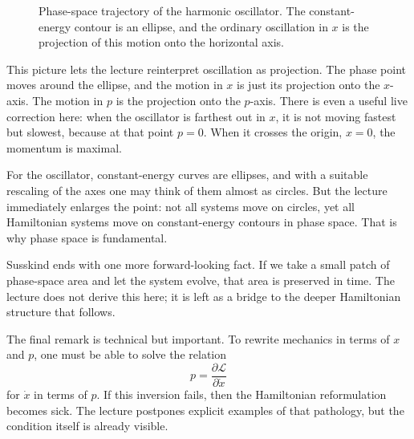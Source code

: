 \begin{figure}[h]
\centering
{}
\caption{Phase-space trajectory of the harmonic oscillator. The constant-energy contour is an ellipse, and the ordinary oscillation in \(x\) is the projection of this motion onto the horizontal axis.}
\end{figure}

This picture lets the lecture reinterpret oscillation as projection. The phase point moves around the ellipse, and the motion in \(x\) is just its projection onto the \(x\)-axis. The motion in \(p\) is the projection onto the \(p\)-axis. There is even a useful live correction here: when the oscillator is farthest out in \(x\), it is not moving fastest but slowest, because at that point \(p=0\). When it crosses the origin, \(x=0\), the momentum is maximal.

For the oscillator, constant-energy curves are ellipses, and with a suitable rescaling of the axes one may think of them almost as circles. But the lecture immediately enlarges the point: not all systems move on circles, yet all Hamiltonian systems move on constant-energy contours in phase space. That is why phase space is fundamental.

Susskind ends with one more forward-looking fact. If we take a small patch of phase-space area and let the system evolve, that area is preserved in time. The lecture does not derive this here; it is left as a bridge to the deeper Hamiltonian structure that follows.

The final remark is technical but important. To rewrite mechanics in terms of \(x\) and \(p\), one must be able to solve the relation
\begin{equation}
p=\frac{\partial\mathcal{L}}{\partial\dot x}
\end{equation}
for \(\dot x\) in terms of \(p\). If this inversion fails, then the Hamiltonian reformulation becomes sick. The lecture postpones explicit examples of that pathology, but the condition itself is already visible.

